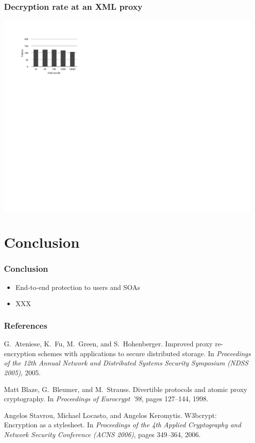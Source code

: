 \documentclass{beamer}
\begin{document}
\begin{frame}
\frametitle{Decryption rate at an XML proxy}
\begin{center}
\includegraphics{server_decrypt} \\
\end{center}
\end{frame}

\section{Conclusion}
\begin{frame}
\frametitle{Conclusion}
\begin{itemize}
\item End-to-end protection to users and SOAs
\item XXX
\end{itemize}
\end{frame}

\begin{thebibliography}{10}
\frametitle{References}
G.~Ateniese, K.~Fu, M.~Green, and S.~Hohenberger.
\newblock Improved proxy re-encryption schemes with applications to secure
  distributed storage.
\newblock In {\em Proceedings of the 12th Annual Network and Distributed
  Systems Security Symposium (NDSS 2005)}, 2005.

Matt Blaze, G.~Bleumer, and M.~Strauss.
\newblock Divertible protocols and atomic proxy cryptography.
\newblock In {\em Proceedings of Eurocrypt '98}, pages 127--144, 1998.

Angelos Stavrou, Michael Locasto, and Angelos Keromytis.
\newblock W3bcrypt: Encryption as a stylesheet.
\newblock In {\em Proceedings of the 4th Applied Cryptography and Network
  Security Conference (ACNS 2006)}, pages 349--364, 2006.

\end{thebibliography}
\end{document}
